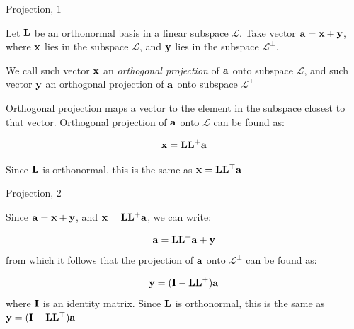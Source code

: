 \documentclass{beamer}
\begin{document}
\begin{frame}{Projection, 1}
	\begin{flushleft}
		
		Let $\mathbf{L}$ be an orthonormal basis in a linear subspace $\mathcal{L}$. Take vector $\mathbf{a} = \mathbf{x} + \mathbf{y}$, where $\mathbf{x}$ lies in the subspace $\mathcal{L}$, and $\mathbf{y}$ lies in the subspace $\mathcal{L}^\perp$.
		
		\bigskip
		
		\begin{definition}
			We call such vector $\mathbf{x}$ an \emph{orthogonal projection} of $\mathbf{a}$ onto subspace $\mathcal{L}$, and such vector $\mathbf{y}$ an orthogonal projection of $\mathbf{a}$ onto subspace $\mathcal{L}^\perp$
		\end{definition}
		
		\bigskip
		
		Orthogonal projection maps a vector to the element in the subspace closest to that vector. Orthogonal projection of $\mathbf{a}$ onto $\mathcal{L}$ can be found as: 
		
		\begin{equation}
			\mathbf{x} = \mathbf{L} \mathbf{L}^+ \mathbf{a}
		\end{equation}
		
		Since $\mathbf{L}$ is orthonormal, this is the same as $\mathbf{x} = \mathbf{L} \mathbf{L}^\top \mathbf{a}$
		
	\end{flushleft}
\end{frame}



\begin{frame}{Projection, 2}
	\begin{flushleft}
		
		Since $\mathbf{a} = \mathbf{x} + \mathbf{y}$, and $\mathbf{x} = \mathbf{L} \mathbf{L}^+ \mathbf{a}$, we can write:
		
		\begin{equation}
			\mathbf{a} = \mathbf{L} \mathbf{L}^+ \mathbf{a} + \mathbf{y}
		\end{equation}
		from which it follows that the projection of $\mathbf{a}$ onto $\mathcal{L}^\perp$ can be found as: 
		
		\begin{equation}
			\mathbf{y} = (\mathbf{I} - \mathbf{L} \mathbf{L}^+) \mathbf{a}
		\end{equation}
		where $\mathbf{I}$ is an identity matrix. Since $\mathbf{L}$ is orthonormal, this is the same as $\mathbf{y} = (\mathbf{I} - \mathbf{L} \mathbf{L}^\top) \mathbf{a}$
		
	\end{flushleft}
\end{frame}
\end{document}
